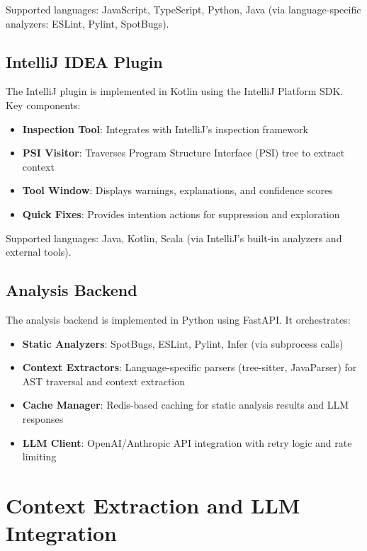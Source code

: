 \documentclass[conference]{IEEEtran}
\begin{document}
Supported languages: JavaScript, TypeScript, Python, Java (via language-specific analyzers: ESLint, Pylint, SpotBugs).

\subsection{IntelliJ IDEA Plugin}

The IntelliJ plugin is implemented in Kotlin using the IntelliJ Platform SDK. Key components:

\begin{itemize}
\item \textbf{Inspection Tool}: Integrates with IntelliJ's inspection framework
\item \textbf{PSI Visitor}: Traverses Program Structure Interface (PSI) tree to extract context
\item \textbf{Tool Window}: Displays warnings, explanations, and confidence scores
\item \textbf{Quick Fixes}: Provides intention actions for suppression and exploration
\end{itemize}

Supported languages: Java, Kotlin, Scala (via IntelliJ's built-in analyzers and external tools).

\subsection{Analysis Backend}

The analysis backend is implemented in Python using FastAPI. It orchestrates:

\begin{itemize}
\item \textbf{Static Analyzers}: SpotBugs, ESLint, Pylint, Infer (via subprocess calls)
\item \textbf{Context Extractors}: Language-specific parsers (tree-sitter, JavaParser) for AST traversal and context extraction
\item \textbf{Cache Manager}: Redis-based caching for static analysis results and LLM responses
\item \textbf{LLM Client}: OpenAI/Anthropic API integration with retry logic and rate limiting
\end{itemize}

\section{Context Extraction and LLM Integration}
\end{document}
